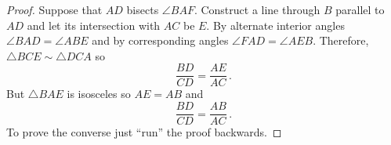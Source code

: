 \begin{proof}
Suppose that $AD$ bisects $\angle BAF$. Construct a line through $B$ parallel to $AD$ and let its intersection with $AC$ be $E$. By alternate interior angles $\angle BAD=\angle ABE$ and by corresponding angles $\angle FAD=\angle AEB$. Therefore, $\triangle BCE\sim \triangle DCA$ so
\[
\frac{BD}{CD}=\frac{AE}{AC}\,.
\]
But $\triangle BAE$ is isosceles so $AE=AB$ and
\[
\frac{BD}{CD}=\frac{AB}{AC}\,.
\]
To prove the converse just ``run'' the proof backwards.\hqed
\end{proof}

\medskip

\begin{center}
\end{center}

